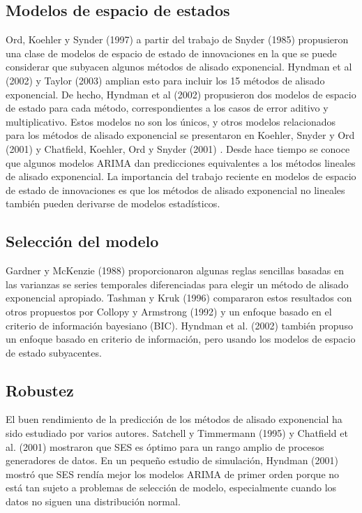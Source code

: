 \documentclass{llncs}
\begin{document}
\subsection{Modelos de espacio de estados}
Ord, Koehler y Synder (1997) \cite{Ord19971621} a partir del trabajo de Snyder (1985)\cite{Snyder1985272}  propusieron una clase de modelos de espacio de estado de innovaciones en la que se puede considerar que subyacen algunos métodos de alisado exponencial. Hyndman et al (2002) \cite{Hyndman2002439} y Taylor (2003) \cite{Taylor2003715} amplian esto para incluir los 15 métodos de alisado exponencial. De hecho, Hyndman et al (2002) \cite{Hyndman2002439}  propusieron dos modelos de espacio de estado para cada método, correspondientes a los casos de error aditivo y multiplicativo. Estos modelos no son los únicos, y otros modelos relacionados para los métodos de alisado exponencial se presentaron en Koehler, Snyder y Ord (2001) \cite{Koehler2001269} y Chatfield, Koehler, Ord y Snyder (2001) \cite{Chatfield2001147}. Desde hace tiempo se conoce que algunos modelos ARIMA dan predicciones equivalentes a los métodos lineales de alisado exponencial. La importancia del trabajo reciente en modelos de espacio de estado de innovaciones es que los métodos de alisado exponencial no lineales también pueden derivarse de modelos estadísticos.

\subsection{Selección del modelo}
Gardner y McKenzie (1988) \cite{GardnerJr1988863} proporcionaron algunas reglas sencillas basadas en las varianzas se series temporales diferenciadas para elegir un método de alisado exponencial apropiado. Tashman y Kruk (1996) \cite{Tashman1996235} compararon estos resultados con otros propuestos por Collopy y Armstrong (1992) \cite{Collopy19921394} y un enfoque basado en el criterio de información bayesiano (BIC). Hyndman et al. (2002) \cite{Hyndman2002439} también propuso un enfoque basado en criterio de información, pero usando los modelos de espacio de estado subyacentes.

\subsection{Robustez}
El buen rendimiento de la predicción de los métodos de alisado exponencial ha sido estudiado por varios autores. Satchell y Timmermann (1995) \cite{Satchell1995407} y Chatfield et al. (2001) \cite{Chatfield2001147} mostraron que SES es óptimo para un rango amplio de procesos generadores de datos. En un pequeño estudio de simulación, Hyndman (2001) \cite{Hyndman2001567} mostró que SES rendía mejor los modelos ARIMA de primer orden porque no está tan sujeto a problemas de selección de modelo, especialmente cuando los datos no siguen una distribución normal.
\end{document}
